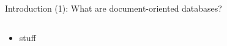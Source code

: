 \begin{frame}{Introduction (1): What are document-oriented databases?}
  \begin{columns}[onlytextwidth]
    \begin{column}{0.6\textwidth}
      \begin{itemize}
          \item stuff
      \end{itemize}
    \end{column}
    \begin{column}[t]{0.4\textwidth}
    \end{column}
  \end{columns}
\end{frame}
